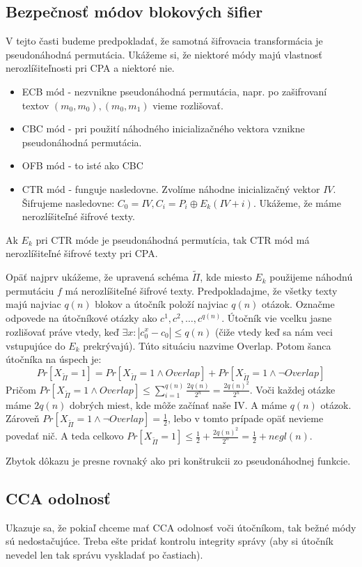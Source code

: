 \subsection{Bezpečnosť módov blokových šifier}

V tejto časti budeme predpokladať, že samotná šifrovacia transformácia je pseudonáhodná permutácia.
Ukážeme si, že niektoré módy majú vlastnosť nerozlíšiteľnosti pri CPA a niektoré nie.

\begin{itemize}
\item ECB mód - nezvnikne pseudonáhodná permutácia, napr. po zašifrovaní textov $(m_0,m_0), (m_0, m_1)$ vieme rozlišovať.
\item CBC mód - pri použití náhodného inicializačného vektora vznikne pseudonáhodná permutácia.
\item OFB mód - to isté ako CBC
\item CTR mód - funguje nasledovne. Zvolíme náhodne inicializačný vektor $IV$. Šifrujeme nasledovne: $C_0 = IV, C_i = P_i \oplus E_k(IV + i)$. Ukážeme, že máme nerozlíšiteľné šifrové texty.
\end{itemize}
\begin{veta}
Ak $E_k$ pri CTR móde je pseudonáhodná permutícia, tak CTR mód má nerozlíšiteľné šifrové texty pri CPA.
\end{veta}
\begin{dokaz}
Opäť najprv ukážeme, že upravená schéma $\tilde{\Pi}$, kde miesto $E_k$ použijeme náhodnú permutáciu $f$
má nerozlíšiteľné šifrové texty. 
Predpokladajme, že všetky texty majú najviac $q(n)$ blokov a útočník položí najviac $q(n)$ otázok.
Označme odpovede na útočníkové otázky ako $c^1, c^2, \dots, c^{q(n)}$. Útočník vie vcelku jasne rozlišovať práve
vtedy, keď $\exists x\colon |c_0^x - c_0| \leq q(n)$ (čiže vtedy keď sa nám veci vstupujúce do $E_k$ \clqq prekrývajú\crqq).
Túto situáciu nazvime Overlap.
Potom šanca útočníka na úspech je:
$$Pr[X_{\tilde{\Pi}} = 1] = Pr[X_{\tilde{\Pi}} = 1 \land Overlap] + Pr[X_{\tilde{\Pi}} = 1 \land \neg Overlap]$$
Pričom $Pr[X_{\tilde{\Pi}} = 1 \land Overlap] \leq \displaystyle\sum_{i=1}^{q(n)} \frac{2q(n)}{2^n} = \frac{2q(n)^2}{2^n}$. Voči každej
otázke máme $2q(n)$ dobrých miest, kde môže začínať naše IV. A máme $q(n)$ otázok.
Zároveň $Pr[X_{\tilde{\Pi}} = 1 \land \neg Overlap] = \frac{1}{2}$, lebo v tomto prípade opäť nevieme povedať nič.
A teda celkovo $Pr[X_{\tilde{\Pi}} = 1] \leq \frac{1}{2} + \frac{2q(n)^2}{2^n} = \frac12 + negl(n)$.

Zbytok dôkazu je presne rovnaký ako pri konštrukcii zo pseudonáhodnej funkcie.
\end{dokaz}

\subsection{CCA odolnosť}
Ukazuje sa, že pokiaľ chceme mať CCA odolnosť voči útočníkom, tak bežné módy sú nedostačujúce.
Treba ešte pridať kontrolu integrity správy (aby si útočník nevedel len tak správu vyskladať po častiach).
